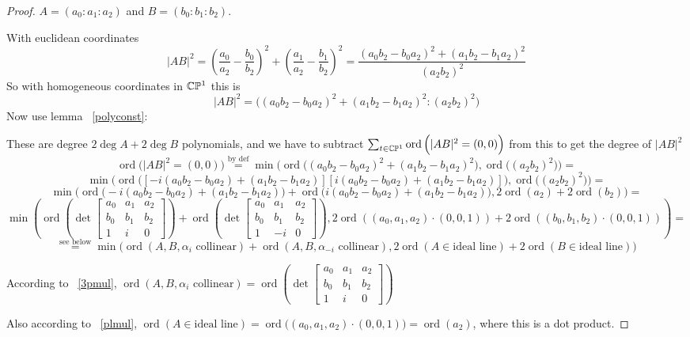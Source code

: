\documentclass[a4paper]{article}
\newcommand{\ord}{\operatorname{ord}}
\begin{document}
\begin{proof}
$A=(a_0:a_1:a_2)$ and $B=(b_0:b_1:b_2)$.




With euclidean coordinates
$$|AB|^2=\left(\frac{a_0}{a_2}-\frac{b_0}{b_2}\right)^2+\left(\frac{a_1}{a_2}-\frac{b_1}{b_2}\right)^2=\frac{(a_0b_2-b_0a_2)^2+(a_1b_2-b_1a_2)^2}{(a_2b_2)^2}$$
So
with homogeneous coordinates in $\mathbb{C}\mathbb{P}^1$ this is
$$|AB|^2=\big((a_0b_2-b_0a_2)^2+(a_1b_2-b_1a_2)^2:(a_2b_2)^2\big)$$
Now use lemma ~\ref{polyconst}:

These are degree $2\deg A+2\deg B$ polynomials, and we have to subtract $\sum_{t\in\cc\pp^1}\ord\Big(|AB|^2=(0,0)\Big)$ from this to get the degree of $|AB|^2$
$$\ord\Big(|AB|^2=(0,0)\Big)\overset{\text{by def}}{=}\min\Big(\ord\big((a_0b_2-b_0a_2)^2+(a_1b_2-b_1a_2)^2\big), \ord\big((a_2b_2)^2\big)\Big)=$$
$$\min\Big(\ord\big([-i(a_0b_2-b_0a_2)+(a_1b_2-b_1a_2)][i(a_0b_2-b_0a_2)+(a_1b_2-b_1a_2)]\big), \ord\big((a_2b_2)^2\big)\Big)=$$
$$\min\Big(\ord\big(-i(a_0b_2-b_0a_2)+(a_1b_2-b_1a_2)\big)+\ord\big(i(a_0b_2-b_0a_2)+(a_1b_2-b_1a_2)\big), 2\ord(a_2)+2\ord(b_2)\Big)=$$
$$\min\left(\ord\left(\det
\begin{bmatrix}
a_0 & a_1 & a_2 \\
b_0 & b_1 & b_2 \\
1 & i & 0
\end{bmatrix}
\right)+\ord\left(\det
\begin{bmatrix}
a_0 & a_1 & a_2 \\
b_0 & b_1 & b_2 \\
1 & -i & 0
\end{bmatrix}
\right),
2\ord((a_0,a_1,a_2)\cdot(0,0,1))+2\ord((b_0,b_1,b_2)\cdot(0,0,1))\right)=$$
$$\overset{\text{see below}}{=}\min\Big(\ord(A,B,\alpha_i\text{ collinear})+\ord(A,B,\alpha_{-i}\text{ collinear}), 2\ord(A\in \text{ideal line})+2\ord(B\in \text{ideal line})\Big)$$

According to ~\ref{3pmul}, $\ord(A,B,\alpha_i\text{ collinear})=\ord\left(\det
\begin{bmatrix}
a_0 & a_1 & a_2 \\
b_0 & b_1 & b_2 \\
1 & i & 0
\end{bmatrix}
\right)$

Also according to ~\ref{plmul}, $\ord(A\in \text{ideal line})=\ord\big((a_0,a_1,a_2)\cdot(0,0,1)\big)=\ord(a_2)$, where this is a dot product.
\end{proof}






\end{document}
